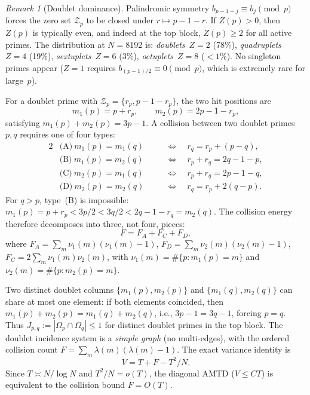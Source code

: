 \documentclass[11pt]{article}
\theoremstyle{definition}
\theoremstyle{remark}
\newtheorem{remark}[theorem]{Remark}
\begin{document}
\begin{remark}[Doublet dominance]
\label{rem:doublet}
Palindromic symmetry
$b_{p-1-j} \equiv b_j \pmod{p}$
forces the zero set $\mathcal{Z}_p$
to be closed under $r \mapsto p-1-r$.
If $Z(p) > 0$, then $Z(p)$ is typically
even, and indeed at the top block,
$Z(p) \ge 2$ for all active primes.
The distribution at $N = 8192$ is:
\emph{doublets}~$Z = 2$ (78\%),
\emph{quadruplets}~$Z = 4$ (19\%),
\emph{sextuplets}~$Z = 6$ (3\%),
\emph{octuplets}~$Z = 8$ ($< 1$\%).
No singleton primes appear
($Z = 1$ requires
$b_{(p-1)/2} \equiv 0 \pmod{p}$,
which is extremely rare for large~$p$).

For a doublet prime with
$\mathcal{Z}_p = \{r_p, p - 1 - r_p\}$,
the two hit positions are
\[
  m_1(p) = p + r_p,
  \qquad
  m_2(p) = 2p - 1 - r_p,
\]
satisfying $m_1(p) + m_2(p) = 3p - 1$.
A collision between two doublet primes~$p, q$
requires one of four types:
\begin{alignat*}{2}
  &\text{(A)}\ m_1(p) = m_1(q)
  &\quad&\Longleftrightarrow\quad
  r_q = r_p + (p - q), \\
  &\text{(B)}\ m_1(p) = m_2(q)
  &&\Longleftrightarrow\quad
  r_p + r_q = 2q - 1 - p, \\
  &\text{(C)}\ m_2(p) = m_1(q)
  &&\Longleftrightarrow\quad
  r_p + r_q = 2p - 1 - q, \\
  &\text{(D)}\ m_2(p) = m_2(q)
  &&\Longleftrightarrow\quad
  r_q = r_p + 2(q - p).
\end{alignat*}
For $q > p$, type~(B) is impossible:
$m_1(p) = p + r_p < 3p/2 < 3q/2 < 2q - 1 - r_q = m_2(q)$.
The collision energy therefore decomposes into three,
not four, pieces:
\begin{equation}\label{eq:F-decomp}
  F = F_A + F_C + F_D,
\end{equation}
where $F_A = \sum_m \nu_1(m)(\nu_1(m){-}1)$,
$F_D = \sum_m \nu_2(m)(\nu_2(m){-}1)$,
$F_C = 2\sum_m \nu_1(m)\nu_2(m)$,
with $\nu_1(m) = \#\{p : m_1(p) = m\}$
and $\nu_2(m) = \#\{p : m_2(p) = m\}$.

Two distinct doublet columns
$\{m_1(p), m_2(p)\}$ and $\{m_1(q), m_2(q)\}$
can share at most one element:
if both elements coincided,
then $m_1(p) + m_2(p) = m_1(q) + m_2(q)$,
i.e., $3p - 1 = 3q - 1$, forcing $p = q$.
Thus $J_{p,q} := |\Omega_p \cap \Omega_q| \le 1$
for distinct doublet primes in the top block.
The doublet incidence system is a
\emph{simple graph} (no multi-edges),
with the ordered collision count
$F = \sum_m \lambda(m)(\lambda(m) - 1)$.
The exact variance identity is
\[
  V = T + F - T^2/N.
\]
Since $T \asymp N/\log N$ and $T^2/N = o(T)$,
the diagonal AMTD ($V \le CT$) is equivalent
to the collision bound $F = O(T)$.


\end{remark}
\end{document}
